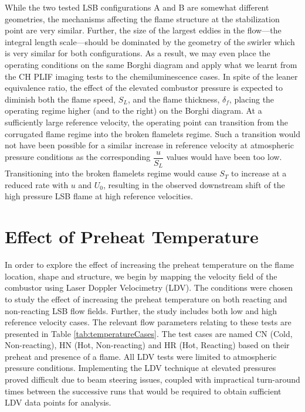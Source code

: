 While the two tested LSB configurations A and B are somewhat different geometries, the mechanisms affecting the flame structure at the stabilization point are very similar.
Further, the size of the largest eddies in the flow---the integral length scale---should be dominated by the geometry of the swirler which is very similar for both configurations.
As a result, we may even place the operating conditions on the same Borghi diagram and apply what we learnt from the CH PLIF imaging tests to the chemiluminescence cases.
In spite of the leaner equivalence ratio, the effect of the elevated combustor pressure is expected to diminish both the flame speed, \(S_L\), and the flame thickness, \(\delta_f\), placing the operating regime higher (and to the right) on the Borghi diagram.
At a sufficiently large reference velocity, the operating point can transition from the corrugated flame regime into the broken flamelets regime.
Such a transition would not have been possible for a similar increase in reference velocity at atmospheric pressure conditions as the corresponding \(\dfrac{ u }{ S_L }\) values would have been too low.
Transitioning into the broken flamelets regime would cause \(S_T\) to increase at a reduced rate with \(u\) and \(U_0\), resulting in the observed downstream shift of the high pressure LSB flame at high reference velocities.

\section{Effect of Preheat Temperature}
\label{sec:lsb-effect-of-preheat-temperature}

In order to explore the effect of increasing the preheat temperature on the flame location, shape and structure, we begin by mapping the velocity field of the combustor using Laser Doppler Velocimetry (LDV).
The conditions were chosen to study the effect of increasing the preheat temperature on both reacting and non-reacting LSB flow fields.
Further, the study includes both low and high reference velocity cases.
The relevant flow parameters relating to these tests are presented in Table \ref{tab:temperatureCases}.
The test cases are named CN (Cold, Non-reacting), HN (Hot, Non-reacting) and HR (Hot, Reacting) based on their preheat and presence of a flame.
All LDV tests were limited to atmospheric pressure conditions.
Implementing the LDV technique at elevated pressures proved difficult due to beam steering issues, coupled with impractical turn-around times between the successive runs that would be required to obtain sufficient LDV data points for analysis.

